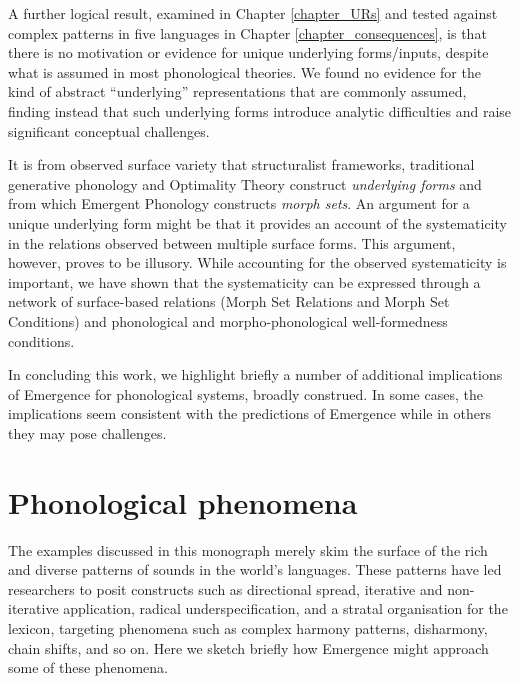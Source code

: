 A further logical result, examined in Chapter \ref{chapter_URs} and tested against complex patterns in five languages in Chapter \ref{chapter_consequences}, is that there is no motivation or evidence for unique underlying forms/inputs, despite what is assumed in most phonological theories. We found no evidence for the kind of abstract ``underlying'' representations that are commonly assumed, finding instead that such underlying forms introduce analytic difficulties  and raise significant conceptual challenges.

It is from observed surface variety that structuralist frameworks, traditional generative phonology and Optimality Theory construct {\it underlying forms} and from which Emergent Phonology constructs {\it morph sets}. An argument for a unique underlying form might be that it provides an account of the systematicity in the relations observed between multiple surface forms. This argument, however, proves to be illusory. While accounting for the observed systematicity is important, we have shown that the systematicity can  be expressed through a network of surface-based relations (Morph Set Relations and Morph Set Conditions) and phonological and morpho-phonological well-formedness conditions.

In concluding this work, we highlight briefly a number of additional implications of Emergence for phonological systems, broadly construed. In some cases, the implications seem consistent with the predictions of Emergence while in others they may pose challenges.

\section{Phonological phenomena}

The examples discussed in this monograph merely skim the surface of the rich and diverse patterns of sounds in the world's languages. These patterns have led researchers to posit constructs such as directional spread, iterative and non-iterative application, radical underspecification, and a stratal organisation for the lexicon, targeting phenomena such as complex harmony patterns, disharmony, chain shifts, and so on. Here we sketch briefly how Emergence might approach some of these phenomena.

